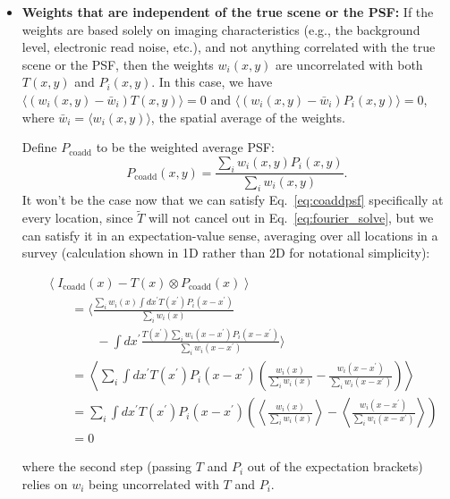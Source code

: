 \documentclass{aastex63}
\begin{document}
\begin{itemize}
    \item \textbf{Weights that are independent of the true scene or the PSF:}  If the weights are based solely on imaging characteristics (e.g., the background level, electronic read noise, etc.), and not anything correlated with the true scene or the PSF, then the weights $w_i(x,y)$ are uncorrelated with both $T(x,y)$ and $P_i(x,y)$.
    In this case, we have $\langle (w_i(x,y)-\bar w_i) T(x,y) \rangle = 0$ and $\langle (w_i(x,y) - \bar w_i) P_i(x,y) \rangle = 0$, where $\bar{w}_i = \langle w_i(x,y)\rangle$, the spatial average of the weights.  
    
    Define $P_\text{coadd}$ to be the weighted average PSF:
    \begin{equation}\label{eq:varweightpsf}
        P_\text{coadd}(x,y) = \frac{\sum_i w_i(x,y) P_i(x,y)}{\sum_i w_i(x,y)}.
    \end{equation}
    It won't be the case now that we can satisfy Eq.~\eqref{eq:coaddpsf} specifically at every location, since $\widetilde{T}$ will not cancel out in Eq.~\eqref{eq:fourier_solve}, but we can satisfy it in an expectation-value sense, averaging over all locations in a survey (calculation shown in 1D rather than 2D for notational simplicity):
    \begin{linenomath}\begin{align*}
      &\left\langle I_\text{coadd}(x) - T(x) \otimes P_\text{coadd}(x) \right\rangle \\
      &\qquad= \Bigg\langle \frac{
                  \sum_i w_i(x) \int dx^\prime  T(x^\prime) P_i(x-x^\prime)  }{\sum_i w_i(x)} \qquad \\
      &\qquad \qquad - \int dx^\prime  \frac{T(x^\prime) \sum_i w_i(x-x^\prime) P_i(x-x^\prime)}{\sum_i w_i(x-x^\prime)} \Bigg\rangle \\
      &\qquad= \left\langle
                  \sum_i \int dx^\prime  T(x^\prime) P_i(x-x^\prime) \left(\frac{w_i(x)}{\sum_i w_i(x)} - \frac{w_i(x-x^\prime)}{\sum_i w_i(x-x^\prime)}\right) \right\rangle \\
      &\qquad=
                  \sum_i \int dx^\prime  T(x^\prime) P_i(x-x^\prime)
                  \left( \left\langle \frac{w_i(x)}{\sum_i w_i(x)}\right\rangle - \left\langle\frac{w_i(x-x^\prime)}{\sum_i w_i(x-x^\prime)}\right\rangle \right)\\
      &\qquad= 0
    \end{align*}\end{linenomath}
    where the second step (passing $T$ and $P_i$ out of the expectation brackets) relies on $w_i$ being uncorrelated with $T$ and $P_i$.
    

\end{itemize}
\end{document}
